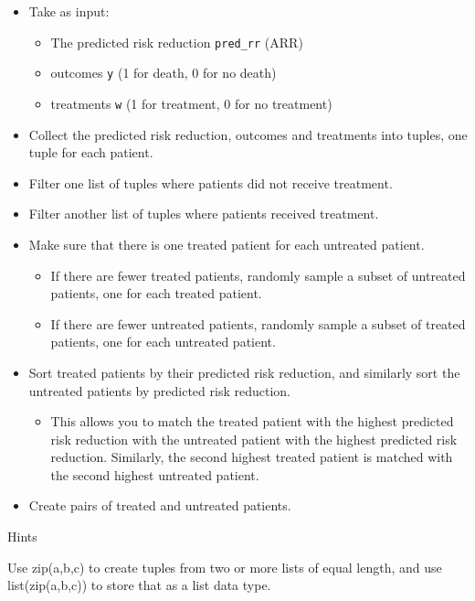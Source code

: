 \documentclass[11pt]{article}
\providecommand{\tightlist}{%
      \setlength{\itemsep}{0pt}\setlength{\parskip}{0pt}}
\begin{document}
\begin{itemize}
\item
  Take as input:

  \begin{itemize}
  \tightlist
  \item
    The predicted risk reduction \texttt{pred\_rr} (ARR)
  \item
    outcomes \texttt{y} (1 for death, 0 for no death)
  \item
    treatments \texttt{w} (1 for treatment, 0 for no treatment)
  \end{itemize}
\item
  Collect the predicted risk reduction, outcomes and treatments into
  tuples, one tuple for each patient.
\item
  Filter one list of tuples where patients did not receive treatment.
\item
  Filter another list of tuples where patients received treatment.
\item
  Make sure that there is one treated patient for each untreated
  patient.

  \begin{itemize}
  \tightlist
  \item
    If there are fewer treated patients, randomly sample a subset of
    untreated patients, one for each treated patient.
  \item
    If there are fewer untreated patients, randomly sample a subset of
    treated patients, one for each untreated patient.
  \end{itemize}
\item
  Sort treated patients by their predicted risk reduction, and similarly
  sort the untreated patients by predicted risk reduction.

  \begin{itemize}
  \tightlist
  \item
    This allows you to match the treated patient with the highest
    predicted risk reduction with the untreated patient with the highest
    predicted risk reduction. Similarly, the second highest treated
    patient is matched with the second highest untreated patient.
  \end{itemize}
\item
  Create pairs of treated and untreated patients.
\end{itemize}

     Hints

Use zip(a,b,c) to create tuples from two or more lists of equal length,
and use list(zip(a,b,c)) to store that as a list data type.
\end{document}

